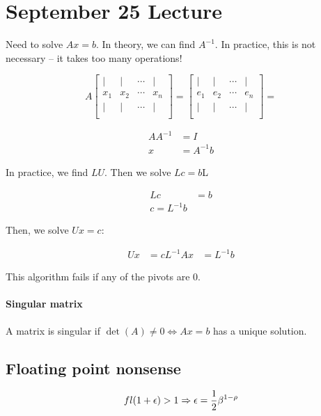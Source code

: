 \section{September 25 Lecture}
Need to solve $Ax=b$. In theory, we can find $A^{-1}$. In practice, this is not necessary -- it takes too many operations!

\[
  A \begin{bmatrix}
    | & | & \cdots & |  \\
    x_1 & x_2 & \cdots & x_n  \\
    | & | & \cdots & |  \\
  \end{bmatrix} = 
  \begin{bmatrix}
    | & | & \cdots & |  \\
    e_1 & e_2 & \cdots & e_n  \\
    | & | & \cdots & |  \\
  \end{bmatrix} = 
\]

\begin{align*}
  A A^{-1} &= I \\
  x &= A^{-1}b
\end{align*}

In practice, we find $LU$. Then we solve $Lc = b$L

\begin{align*}
  Lc &= b \\
  c = L^{-1}b
\end{align*}

Then, we solve $Ux = c$:

\begin{align*}
  Ux &= c
  L^{-1} A x &= L^{-1} b
\end{align*}

This algorithm fails if any of the pivots are 0.

\paragraph{Singular matrix} A matrix is singular if $\det(A) \not= 0 \iff Ax = b$ has a unique solution.

\subsection{Floating point nonsense}

\[
  fl(1 + \epsilon) > 1 \Rightarrow \epsilon = {1 \over 2} \beta^{1 - \rho}
\]

